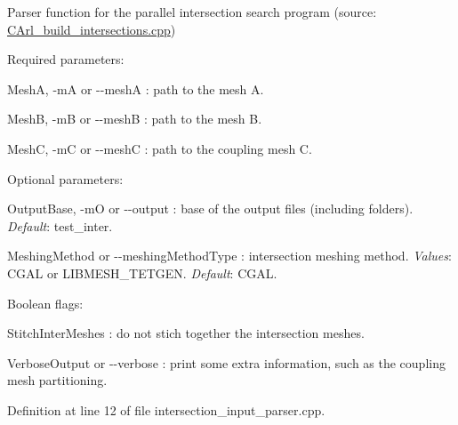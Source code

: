 Parser function for the parallel intersection search program (source\+: \hyperlink{_c_arl__build__intersections_8cpp}{C\+Arl\+\_\+build\+\_\+intersections.\+cpp}) 

Required parameters\+:
\begin{DoxyItemize}
\item {\ttfamily Mesh\+A}, {\ttfamily -\/m\+A} or {\ttfamily -\/-\/mesh\+A} \+: path to the mesh A.
\item {\ttfamily Mesh\+B}, {\ttfamily -\/m\+B} or {\ttfamily -\/-\/mesh\+B} \+: path to the mesh B.
\item {\ttfamily Mesh\+C}, {\ttfamily -\/m\+C} or {\ttfamily -\/-\/mesh\+C} \+: path to the coupling mesh C.
\end{DoxyItemize}

Optional parameters\+:
\begin{DoxyItemize}
\item {\ttfamily Output\+Base}, {\ttfamily -\/m\+O} or {\ttfamily -\/-\/output} \+: base of the output files (including folders). {\itshape Default}\+: {\ttfamily test\+\_\+inter}.
\item {\ttfamily Meshing\+Method} or {\ttfamily -\/-\/meshing\+Method\+Type} \+: intersection meshing method. {\itshape Values}\+: {\ttfamily C\+G\+A\+L} or {\ttfamily L\+I\+B\+M\+E\+S\+H\+\_\+\+T\+E\+T\+G\+E\+N}. {\itshape Default}\+: {\ttfamily C\+G\+A\+L}.
\end{DoxyItemize}

Boolean flags\+:
\begin{DoxyItemize}
\item {\ttfamily Stitch\+Inter\+Meshes} \+: do not stich together the intersection meshes.
\item {\ttfamily Verbose\+Output} or {\ttfamily -\/-\/verbose} \+: print some extra information, such as the coupling mesh partitioning. 
\end{DoxyItemize}

Definition at line 12 of file intersection\+\_\+input\+\_\+parser.\+cpp.


